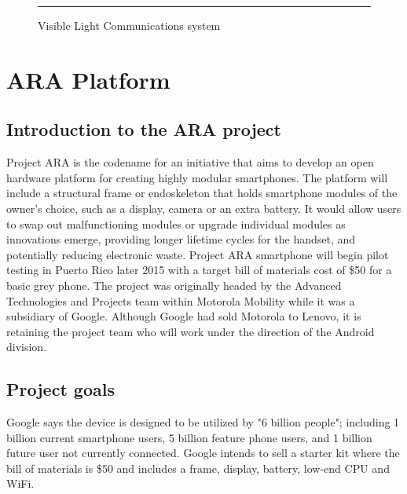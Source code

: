 \begin{figure}[ht]
  \centering
    \rule{35em}{0.5pt}
  \caption[VLC Receiver front-end circuit]{Visible Light Communications system}
  \label{fig:RxCircuit}
\end{figure}

\section{ARA Platform}
\subsection{Introduction to the ARA project}

Project ARA is the codename for an initiative that aims to develop an open hardware platform for creating highly modular smartphones. The platform will include a structural frame or endoskeleton that holds smartphone modules of the owner's choice, such as a display, camera or an extra battery. It would allow users to swap out malfunctioning modules or upgrade individual modules as innovations emerge, providing longer lifetime cycles for the handset, and potentially reducing electronic waste. Project ARA smartphone will begin pilot testing in Puerto Rico later 2015 with a target bill of materials cost of \$50 for a basic grey phone. The project was originally headed by the Advanced Technologies and Projects team within Motorola Mobility while it was a subsidiary of Google. Although Google had sold Motorola to Lenovo, it is retaining the project team who will work under the direction of the Android division.

\subsection{Project goals}
Google says the device is designed to be utilized by "6 billion people"; including 1 billion current smartphone users, 5 billion feature phone users, and 1 billion future user not currently connected. Google intends to sell a starter kit where the bill of materials is \$50 and includes a frame, display, battery, low-end CPU and WiFi.


